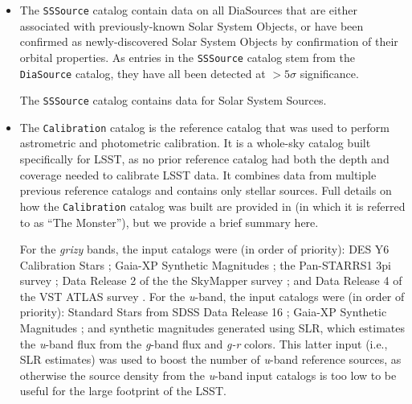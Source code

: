 \begin{itemize}
\item The \texttt{SSSource} catalog contain data on all DiaSources that are either associated with previously-known Solar System Objects, or have been confirmed as newly-discovered Solar System Objects by confirmation of their orbital properties. As entries in the \texttt{SSSource} catalog stem from the \texttt{DiaSource} catalog, they have all been detected at $>5\sigma$ significance.

The \texttt{SSSource} catalog contains data for \nsolarsystemsources Solar System Sources.



\item The \texttt{Calibration} catalog is the reference catalog that was used to perform astrometric and photometric \gls{calibration}. It is a whole-sky catalog built specifically for \gls{LSST}, as no prior reference catalog had both the depth and coverage needed to calibrate \gls{LSST} data.
It combines data from multiple previous reference catalogs and contains only stellar sources.
Full details on how the \texttt{Calibration} catalog was built are provided in \cite{DMTN-277} (in which it is referred to as ``The Monster''), but we provide a brief summary here.

For the \textit{grizy} bands, the input catalogs were (in order of priority): \gls{DES} Y6 Calibration Stars \citep{2023arXiv230501695R}; Gaia-\gls{XP} Synthetic Magnitudes \citep{2023A&A...674A..33G}; the \gls{Pan-STARRS}1 3pi survey \citep{2016arXiv161205560C}; \gls{Data Release} 2 of the the SkyMapper survey \citep{2019PASA...36...33O}; and \gls{Data Release} 4 of the \gls{VST} \gls{ATLAS} survey \citep{2015MNRAS.451.4238S}. For the \textit{u}-band, the input catalogs were (in order of priority): Standard Stars from \gls{SDSS} \gls{Data Release} 16 \citep{2020ApJS..249....3A}; Gaia-\gls{XP} Synthetic Magnitudes \citep{2023A&A...674A..33G}; and synthetic magnitudes generated using \gls{SLR}, which estimates the \textit{u}-band \gls{flux} from the \textit{g}-band \gls{flux} and \textit{g-r} colors. This latter input (i.e., \gls{SLR} estimates) was used to boost the number of \textit{u}-band reference sources, as otherwise the source density from the \textit{u}-band input catalogs is too low to be useful for the large footprint of the \gls{LSST}.


\end{itemize}
